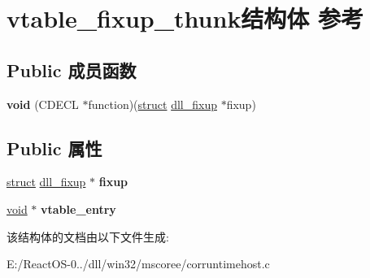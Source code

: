 \hypertarget{structvtable__fixup__thunk}{}\section{vtable\+\_\+fixup\+\_\+thunk结构体 参考}
\label{structvtable__fixup__thunk}
\subsection*{Public 成员函数}
\begin{DoxyCompactItemize}
\item 
\mbox{\label{structvtable__fixup__thunk_ac28b1a01ffb74a378408cc095a748506}} 
{\bfseries void} (C\+D\+E\+CL $\ast$function)(\hyperlink{interfacestruct}{struct} \hyperlink{structdll__fixup}{dll\+\_\+fixup} $\ast$fixup)
\end{DoxyCompactItemize}
\subsection*{Public 属性}
\begin{DoxyCompactItemize}
\item 
\mbox{\label{structvtable__fixup__thunk_a6325de4905c212d246fb2aa64b9e4d9e}} 
\hyperlink{interfacestruct}{struct} \hyperlink{structdll__fixup}{dll\+\_\+fixup} $\ast$ {\bfseries fixup}
\item 
\mbox{\label{structvtable__fixup__thunk_ae21db95f800ed00044c14ddc225f8696}} 
\hyperlink{interfacevoid}{void} $\ast$ {\bfseries vtable\+\_\+entry}
\end{DoxyCompactItemize}


该结构体的文档由以下文件生成\+:\begin{DoxyCompactItemize}
\item 
E\+:/\+React\+O\+S-\/0../dll/win32/mscoree/corruntimehost.\+c\end{DoxyCompactItemize}
